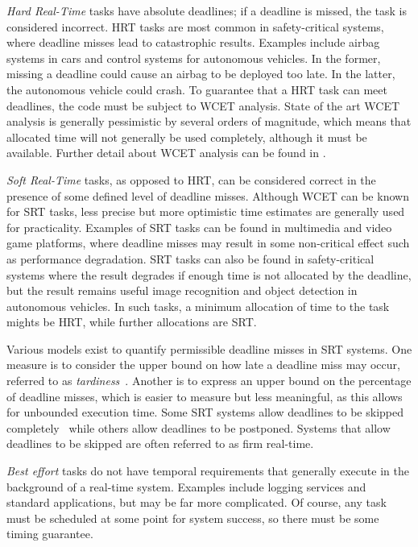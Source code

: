 \emph{Hard Real-Time} tasks have absolute deadlines; if a deadline is missed,
the task is considered incorrect. \gls{HRT} tasks are most common in safety-critical systems, where
deadline misses lead to catastrophic results.  Examples include airbag systems
in cars and control systems for autonomous vehicles.  In the former, missing a deadline could cause
an airbag to be deployed too late.  In the latter, the autonomous vehicle could crash.  To guarantee
that a \gls{HRT} task can meet deadlines, the code must be subject to {\gls{WCET}} analysis. State
of the art {\gls{WCET}} analysis is generally pessimistic by several orders of magnitude, which
means that allocated time will not generally be used completely, although it must be available.
Further detail about {\gls{WCET}} analysis can be found in \citet{Lv_GZDYZ_09}.

\emph{Soft Real-Time} tasks, as opposed to \gls{HRT}, can be
considered correct in the presence of some defined level of deadline misses. Although {\gls{WCET}}
can be known for {\gls{SRT}} tasks, less precise but more optimistic time estimates are generally
used for practicality.  Examples of \gls{SRT} tasks can be found in multimedia and video game platforms,
where deadline misses may result in some non-critical effect such as performance degradation.
\gls{SRT} tasks can also be found in safety-critical systems where the result degrades if enough time is not
allocated by the deadline, but the result remains useful \eg image recognition and object detection
in autonomous vehicles. In such tasks, a minimum allocation of time to the task mights be \gls{HRT},
while further allocations are \gls{SRT}.

Various models exist to quantify permissible deadline misses in \gls{SRT} systems.  One measure is
to consider the upper bound on how late a deadline miss may occur, referred to as
\emph{tardiness}~\citep{Devi:phd}.  Another is to express an upper bound on the percentage of
deadline misses, which is easier to measure but less meaningful, as this allows for unbounded
execution time.  Some \gls{SRT} systems allow deadlines to be skipped
completely~\citep{Koren_Shasha_95} while others allow deadlines to be postponed. Systems that allow
deadlines to be skipped are often referred to as firm real-time.

\emph{Best effort} tasks do not have temporal requirements that generally execute in the
background of a real-time system. Examples include logging services and standard applications, but
may be far more complicated. Of course, any task must be scheduled at some point for system success,
so there must be some timing guarantee. 

